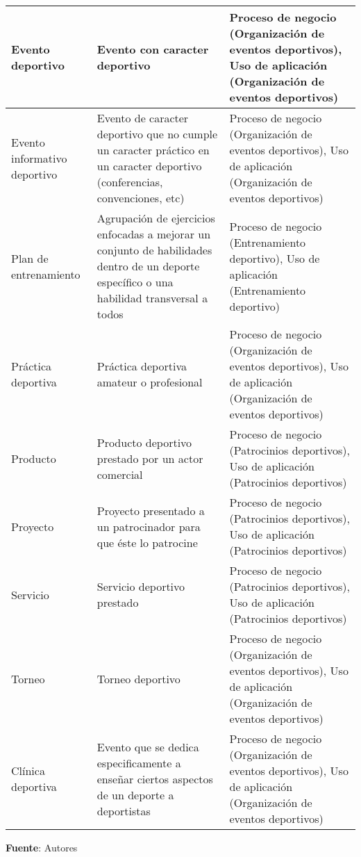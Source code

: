 \begin{center}
\begin{longtable}{|p{4cm}|p{7cm}|p{4cm}|}
		\hline
		Evento deportivo & 
		Evento con caracter deportivo & 
		Proceso de negocio (Organización de eventos deportivos), Uso de aplicación (Organización de eventos deportivos)
		\\
		\hline
		Evento informativo deportivo & 
		Evento de caracter deportivo que no cumple un caracter práctico en un caracter deportivo (conferencias, convenciones, etc) & 
		Proceso de negocio (Organización de eventos deportivos), Uso de aplicación (Organización de eventos deportivos)
		\\
		\hline
		Plan de entrenamiento & 
		Agrupación de ejercicios enfocadas a mejorar un conjunto de habilidades dentro de un deporte específico o una habilidad transversal a todos & 
		Proceso de negocio (Entrenamiento deportivo), Uso de aplicación (Entrenamiento deportivo)
		\\
		\hline
		Práctica deportiva & 
		Práctica deportiva amateur o profesional & 
		Proceso de negocio (Organización de eventos deportivos), Uso de aplicación (Organización de eventos deportivos)
		\\
		\hline
		Producto & 
		Producto deportivo prestado por un actor comercial & 
		Proceso de negocio (Patrocinios deportivos), Uso de aplicación (Patrocinios deportivos)
		\\
		\hline
		Proyecto & 
		Proyecto presentado a un patrocinador para que éste lo patrocine & 
		Proceso de negocio (Patrocinios deportivos), Uso de aplicación (Patrocinios deportivos)
		\\
		\hline
		Servicio & 
		Servicio deportivo prestado & 
		Proceso de negocio (Patrocinios deportivos), Uso de aplicación (Patrocinios deportivos)
		\\
		\hline
		Torneo & 
		Torneo deportivo & 
		Proceso de negocio (Organización de eventos deportivos), Uso de aplicación (Organización de eventos deportivos)
		\\
		\hline
		Clínica deportiva & 
		Evento que se dedica especificamente a enseñar ciertos aspectos de un deporte a deportistas & 
		Proceso de negocio (Organización de eventos deportivos), Uso de aplicación (Organización de eventos deportivos)
		\\
		\hline
		\end{longtable}
	\textbf{Fuente}: Autores
\end{center}

